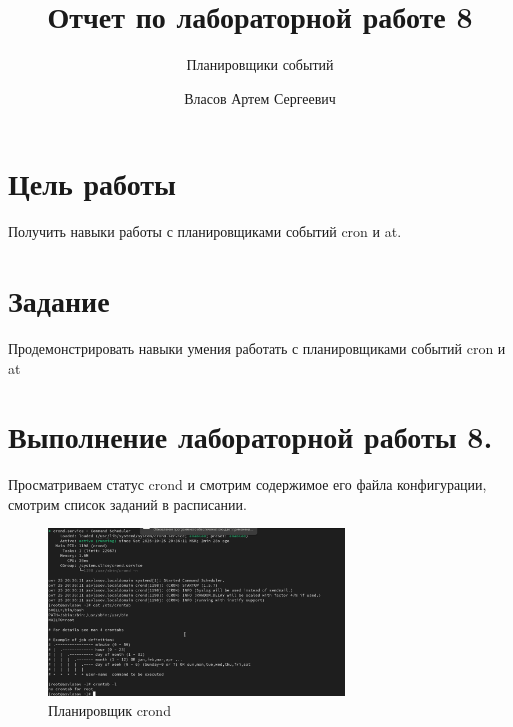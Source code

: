 \documentclass[
  12pt,
  a4paper,
  DIV=11,
  numbers=noendperiod]{scrreprt}
\title{Отчет по лабораторной работе 8}
\subtitle{Планировщики событий}
\author{Власов Артем Сергеевич}
\date{}
\renewcommand*\contentsname{Содержание}
\newcommand\contentsname{Содержание}
\begin{document}
\maketitle

\renewcommand*\contentsname{Содержание}
{
\setcounter{tocdepth}{1}
\tableofcontents
}
\listoffigures
\listoftables
{}
\chapter{Цель
работы}\label{ux446ux435ux43bux44c-ux440ux430ux431ux43eux442ux44b}

Получить навыки работы с планировщиками событий cron и at.

\chapter{Задание}\label{ux437ux430ux434ux430ux43dux438ux435}

Продемонстрировать навыки умения работать с планировщиками событий cron
и at

\chapter{Выполнение лабораторной работы
8.}\label{ux432ux44bux43fux43eux43bux43dux435ux43dux438ux435-ux43bux430ux431ux43eux440ux430ux442ux43eux440ux43dux43eux439-ux440ux430ux431ux43eux442ux44b-8.}

Просматриваем статус crond и смотрим содержимое его файла конфигурации,
смотрим список заданий в расписании.

\begin{figure}

{\centering \includegraphics[width=0.7\textwidth,height=\textheight]{image/1.png}

}

\caption{Планировщик crond}

\end{figure}%
\end{document}
